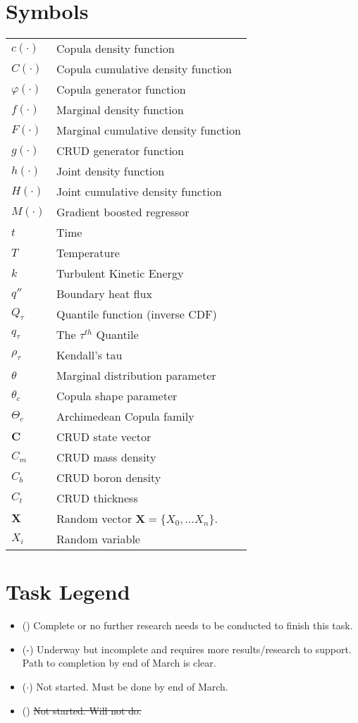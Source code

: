 \section*{Symbols}
\begin{tabular}{l l}
$c(\cdot)$ & Copula density function \\
$C(\cdot)$ & Copula cumulative density function \\
$\varphi(\cdot)$ & Copula generator function \\
$f(\cdot)$ & Marginal density function \\
$F(\cdot)$ & Marginal cumulative density function \\
$g(\cdot)$ & CRUD generator function \\
$h(\cdot)$ & Joint density function \\
$H(\cdot)$ & Joint cumulative density function \\
$M(\cdot)$ & Gradient boosted regressor \\
$t$ & Time \\
$T$ & Temperature \\
$k$ & Turbulent Kinetic Energy \\
$q''$ & Boundary heat flux \\
$Q_{\tau}$ & Quantile function (inverse CDF) \\
$q_{\tau}$ & The $\tau^{th}$ Quantile \\
$\rho_{\tau}$ & Kendall's tau \\
$\theta$ & Marginal distribution parameter \\
$\theta_c$ & Copula shape parameter \\
$\Theta_c$ & Archimedean Copula family \\
$\mathbf C$ & CRUD state vector \\
$C_m$ & CRUD mass density \\
$C_b$ & CRUD boron density \\
$C_t$ & CRUD thickness \\
$\mathbf X$ & Random vector $\mathbf X = \{X_0, ... X_n\}$. \\
$X_i$ & Random variable \\
\end{tabular}


\section*{Task Legend}

\begin{itemize}
    \item (\checkmark)  Complete or no further research needs to be conducted to finish this task.
    \item (\checkmark-)  Underway but incomplete and requires more results/research to support.  Path to completion by end of March is clear.
    \item ($\cdot$)  Not started.  Must be done by end of March.
    \item (\xmark)  \sout{Not started.  Will not do.}
\end{itemize}

\listoffigures

\listoftables

\pagebreak
